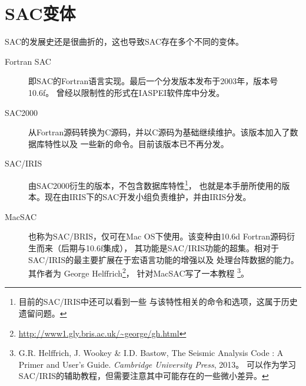 \section{SAC变体}

SAC的发展史还是很曲折的，这也导致SAC存在多个不同的变体。

\begin{description}
\item[Fortran SAC]  即SAC的Fortran语言实现。最后一个分发版本发布于2003年，版本号10.6f。
                    曾经以限制性的形式在IASPEI软件库中分发。
\item[SAC2000]      从Fortran源码转换为C源码，并以C源码为基础继续维护。该版本加入了数据库特性以及
                    一些新的命令。目前该版本已不再分发。
\item[SAC/IRIS]     由SAC2000衍生的版本，不包含数据库特性\footnote{目前的SAC/IRIS中还可以看到一些
                    与该特性相关的命令和选项，这属于历史遗留问题。}，
                    也就是本手册所使用的版本。现在由IRIS下的SAC开发小组负责维护，并由IRIS分发。
\item[MacSAC]       也称为SAC/BRIS，仅可在Mac OS下使用。该变种由10.6d Fortran源码衍生而来（后期与10.6f集成），
                    其功能是SAC/IRIS功能的超集。相对于SAC/IRIS的最主要扩展在于宏语言功能的增强以及
                    处理台阵数据的能力。其作者为
                    George Helffrich\footnote{\url{http://www1.gly.bris.ac.uk/~george/gh.html}}，
                    针对MacSAC写了一本教程
                    \footnote{G.R. Helffrich, J. Wookey \& I.D. Bastow, The Seismic Analysis Code
                    : A Primer and User's Guide. \textsl{Cambridge University Press}, 2013。
                    可以作为学习SAC/IRIS的辅助教程，但需要注意其中可能存在的一些微小差异。}。
\end{description}
